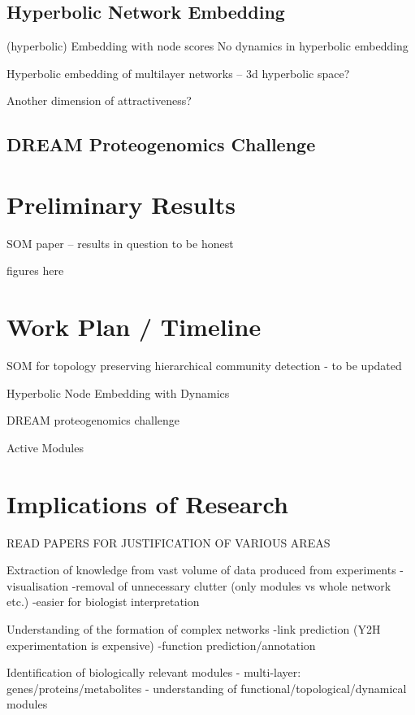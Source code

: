 \documentclass{report}
\begin{document}
	
	\section{Hyperbolic Network Embedding}
	
	(hyperbolic) Embedding with node scores 
	No dynamics in hyperbolic embedding

	
	Hyperbolic embedding of multilayer networks -- 3d hyperbolic space?
	 
	Another dimension of attractiveness?
	
		
	\section{DREAM Proteogenomics Challenge}
	
	
	\chapter{Preliminary Results}
	
	SOM paper -- results in question to be honest
	
	figures here
	
	
	\chapter{Work Plan / Timeline}
	
	SOM for topology preserving hierarchical community detection
	- to be updated 
	
	Hyperbolic Node Embedding with Dynamics
	
	DREAM proteogenomics challenge
	
	Active Modules 
	
	
	
	\chapter{Implications of Research}
	
	READ PAPERS FOR JUSTIFICATION OF VARIOUS AREAS
	
	Extraction of knowledge from vast volume of data produced from experiments
	-visualisation
	-removal of unnecessary clutter (only modules vs whole network etc.)
	-easier for biologist interpretation
	
	Understanding of the formation of complex networks
	-link prediction (Y2H experimentation is expensive)
	-function prediction/annotation
	
	Identification of biologically relevant modules
	- multi-layer: genes/proteins/metabolites
	- understanding of functional/topological/dynamical modules
	
\end{document}

